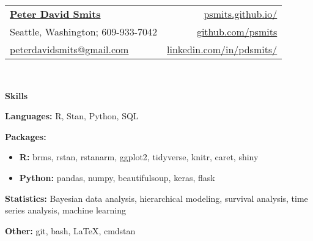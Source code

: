\documentclass[letterpaper,11pt]{article}
\newcommand{\resheading}[1]{
  {\large \colorbox{mygrey}{\begin{minipage}{\textwidth}{\textbf{#1 \vphantom{p\^{E}}}}\end{minipage}}}
}
\begin{document}
\newcommand{\mywebheader}{
  \begin{tabular*}{7in}{l@{\extracolsep{\fill}}r}
    \textbf{\href{https://psmits.github.io/}{\Large Peter David Smits}} & \href{https://psmits.github.io/}{psmits.github.io/} \\
    Seattle, Washington; 609-933-7042 & \href{https://github.com/psmits}{github.com/psmits} \\
    \href{mailto:peterdavidsmits@gmail.com}{peterdavidsmits@gmail.com} & \href{https://www.linkedin.com/in/pdsmits/}{linkedin.com/in/pdsmits/} \\
  \end{tabular*}
  \\
\vspace{0.05in}
}

\mywebheader



\resheading{Skills}
\begin{description}[itemsep=0mm]
    \item \textbf{Languages:}  R, Stan, Python, SQL 
    \item \textbf{Packages:} 
      \begin{itemize}[itemsep=0mm]
        \item \textbf{R:} brms, rstan, rstanarm, ggplot2, tidyverse, knitr, caret, shiny
        \item \textbf{Python:} pandas, numpy, beautifulsoup, keras, flask
      \end{itemize}
    \item \textbf{Statistics:} Bayesian data analysis, hierarchical modeling, survival analysis, time series analysis, machine learning 
    \item \textbf{Other:} git, bash, \LaTeX, cmdstan
\end{description} %
\end{document}
